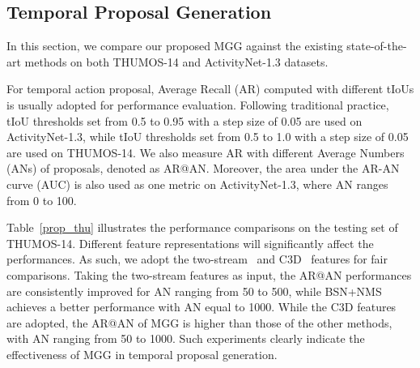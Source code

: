 \documentclass[10pt,twocolumn,letterpaper]{article}
\begin{document}
\subsection{Temporal Proposal Generation}
In this section, we compare our proposed MGG against the existing state-of-the-art methods on both THUMOS-14 and ActivityNet-1.3 datasets.

For temporal action proposal, Average Recall (AR) computed with different tIoUs is usually adopted for performance evaluation. Following traditional practice, tIoU thresholds set from 0.5 to 0.95 with a step size of 0.05 are used on ActivityNet-1.3, while tIoU thresholds set from 0.5 to 1.0 with a step size of 0.05 are used on THUMOS-14. We also measure AR with different Average Numbers (ANs) of proposals, denoted as AR@AN. Moreover, the area under the AR-AN curve (AUC) is also used as one metric on ActivityNet-1.3, where AN ranges from 0 to 100.




Table~\ref{prop_thu} illustrates the performance comparisons on the testing set of THUMOS-14. Different feature representations will significantly affect the performances. As such, we adopt the two-stream~\cite{2stream} and C3D~\cite{c3d} features for fair comparisons. Taking the two-stream features as input, the AR@AN performances are consistently improved for AN ranging from 50 to 500, while BSN+NMS achieves a better performance with AN equal to 1000. While the C3D features are adopted, the AR@AN of MGG is higher than those of the other methods, with AN ranging from 50 to 1000. Such experiments clearly indicate the effectiveness of MGG in temporal proposal generation. 
\end{document}
